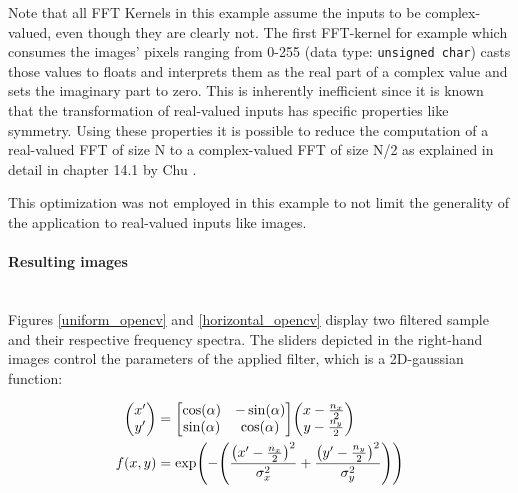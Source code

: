 \documentclass[english,11pt,a4paper,table]{article} %
\let\originalleft\left
\let\originalright\right
\renewcommand{\left}{\mathopen{}\mathclose\bgroup\originalleft}
\renewcommand{\right}{\aftergroup\egroup\originalright}
\begin{document}
Note that all FFT Kernels in this example assume the inputs to be complex-valued, even though they are clearly not.
The first FFT-kernel for example which consumes the images' pixels ranging from 0-255 (data type: \texttt{unsigned char}) casts those values to floats and interprets them as the real part of a complex value and sets the imaginary part to zero.
This is inherently inefficient since it is known that the transformation of real-valued inputs has specific properties like symmetry.
Using these properties it is possible to reduce the computation of a real-valued FFT of size N to a complex-valued FFT of size N/2 as explained in detail in chapter 14.1 by Chu \cite{ChuEleanor2000ItFb}.

This optimization was not employed in this example to not limit the generality of the application to real-valued inputs like images.
\paragraph{Resulting images}\mbox{}\\

Figures \ref{uniform_opencv} and \ref{horizontal_opencv} display two filtered sample and their respective frequency spectra.
The sliders depicted in the right-hand images control the parameters of the applied filter, which is a 2D-gaussian function:

\begin{align*}
	\begin{pmatrix}
		x^\prime \\ y^\prime
	\end{pmatrix} & = \begin{bmatrix}
		                  \cos(\alpha) & -\sin(\alpha) \\
		                  \sin(\alpha) & \cos(\alpha)
	                  \end{bmatrix} \begin{pmatrix}
		                                x-\frac{n_x}{2} \\ y-\frac{n_y}{2}
	                                \end{pmatrix}                                                                                                              \\
	f(x,y)               & = \exp \left( -\left( \frac{\left(x^\prime-\frac{n_x}{2}\right)^2}{\sigma_x^2} + \frac{\left(y^\prime-\frac{n_y}{2}\right)^2}{\sigma_y^2}\right)\right)
\end{align*}
\end{document}
